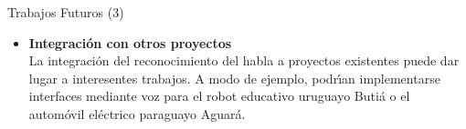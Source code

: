 \begin{frame}{Trabajos Futuros (3)}
\begin{itemize}

\item{\textbf{Integraci\'on con otros proyectos\\}}
La integraci\'on del reconocimiento del habla a proyectos existentes puede dar lugar a interesentes trabajos.
A modo de ejemplo, podr{\'\i}an implementarse interfaces mediante voz para el robot educativo uruguayo 
Buti\'a \cite{Butia} o el autom\'ovil el\'ectrico paraguayo Aguar\'a.
\end{itemize}
\end{frame}
